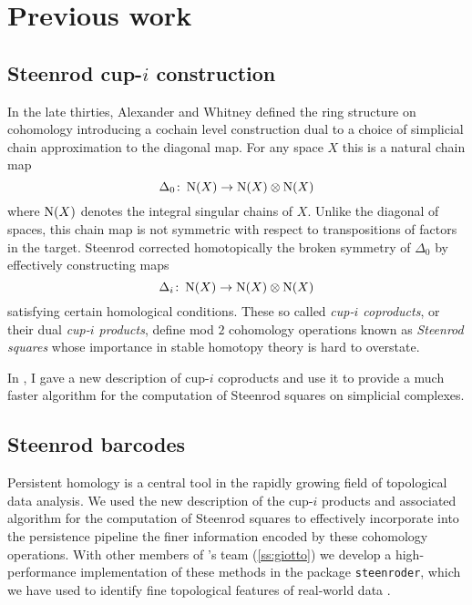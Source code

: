 
\section{Previous work} \label{s:past}

\subsection{Steenrod cup-$i$ construction} \label{ss:cup-i}

In the late thirties, Alexander and Whitney defined the ring structure on cohomology introducing a cochain level construction dual to a choice of simplicial chain approximation to the diagonal map.
For any space $X$ this is a natural chain map
\[
\Delta_0 \colon \operatorname{N}(X) \to \operatorname{N}(X) \otimes \operatorname{N}(X)
\]
where $\operatorname{N}(X)$ denotes the integral singular chains of $X$.
Unlike the diagonal of spaces, this chain map is not symmetric with respect to transpositions of factors in the target.
Steenrod \cite{steenrod1947products} corrected homotopically the broken symmetry of $\Delta_0$ by effectively constructing maps
\begin{equation*}
\Delta_i \colon \operatorname{N}(X) \to \operatorname{N}(X) \otimes \operatorname{N}(X)
\end{equation*}
satisfying certain homological conditions.
These so called \textit{cup-$i$ coproducts}, or their dual \textit{cup-$i$ products}, define mod $2$ cohomology operations known as \textit{Steenrod squares} whose importance in stable homotopy theory is hard to overstate.

In \cite{medina2021newformulas}, I gave a new description of cup-$i$ coproducts and use it to provide a much faster algorithm for the computation of Steenrod squares on simplicial complexes.

\subsection{Steenrod barcodes}

Persistent homology is a central tool in the rapidly growing field of topological data analysis.
We used the new description of the cup-$i$ products and associated algorithm for the computation of Steenrod squares to effectively incorporate into the persistence pipeline the finer information encoded by these cohomology operations.
With other members of \giottoTDA's team (\cref{ss:giotto}) we develop a high-performance implementation of these methods in the package \texttt{steenroder}, which we have used to identify fine topological features of real-world data \cite{medina2018persistence}.

